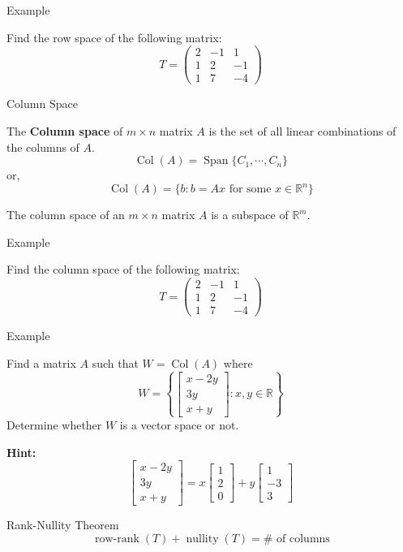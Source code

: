 \documentclass[11pt]{beamer}
\theoremstyle{plain}
\begin{document}
\begin{frame}{Example}
    \begin{example}
        Find the row space of the following matrix:
        $$
        T=\begin{pmatrix}
            2&-1&1\\1&2&-1\\1&7&-4
        \end{pmatrix}
        $$
    \end{example}
\end{frame}



\begin{frame}{Column Space}
    \begin{definition}
        The \textbf{Column space} of $m\times n$ matrix $A$ is the set of all linear combinations of the columns of $A$. 
        $$\operatorname{Col}(A)=\operatorname{Span}\{C_1,\cdots, C_n\}$$
        or, 
        $$\operatorname{Col}(A)=\{b:b=Ax\text{ for some }x\in\mathbb R^n\}$$
    \end{definition}
    The column space of an $m\times n$ matrix $A$ is a subspace of $\mathbb R^m$. 
\end{frame}


\begin{frame}{Example}
    \begin{example}
        Find the column space of the following matrix:
        $$
        T=\begin{pmatrix}
            2&-1&1\\1&2&-1\\1&7&-4
        \end{pmatrix}
        $$
    \end{example}
\end{frame}



\begin{frame}{Example}
\begin{example}
    Find a matrix $A$ such that $W=\operatorname{Col}(A)$ where 
    $$W=\left\{
    \begin{bmatrix}
        x-2y\\3y\\x+y
    \end{bmatrix}:x,y\in\mathbb R
    \right\}$$
Determine whether $W$ is a vector space or not. 
\end{example}
    \textbf{Hint:}
    $$
    \begin{bmatrix}
        x-2y\\3y\\x+y
    \end{bmatrix}=x\begin{bmatrix}
        1\\2\\0
    \end{bmatrix}+y\begin{bmatrix}
        1\\-3\\3
    \end{bmatrix}
    $$
\end{frame}


\begin{frame}{Rank-Nullity Theorem}
    $$
    \operatorname{row-rank}(T)+\operatorname{nullity}(T)=\# \text{ of columns}
    $$
\end{frame}
\end{document}
